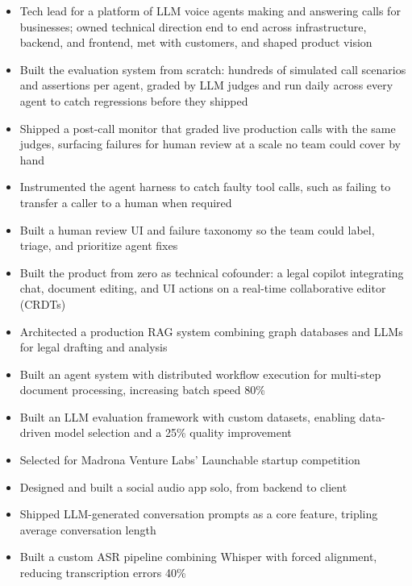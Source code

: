 \documentclass{my_cv}
\begin{document}
\begin{itemize}
\item Tech lead for a platform of LLM voice agents making and answering calls for businesses; owned technical direction end to end across infrastructure, backend, and frontend, met with customers, and shaped product vision
\item Built the evaluation system from scratch: hundreds of simulated call scenarios and assertions per agent, graded by LLM judges and run daily across every agent to catch regressions before they shipped
\item Shipped a post-call monitor that graded live production calls with the same judges, surfacing failures for human review at a scale no team could cover by hand
\item Instrumented the agent harness to catch faulty tool calls, such as failing to transfer a caller to a human when required
\item Built a human review UI and failure taxonomy so the team could label, triage, and prioritize agent fixes
\end{itemize}


\begin{itemize}
\item Built the product from zero as technical cofounder: a legal copilot integrating chat, document editing, and UI actions on a real-time collaborative editor (CRDTs)
\item Architected a production RAG system combining graph databases and LLMs for legal drafting and analysis
\item Built an agent system with distributed workflow execution for multi-step document processing, increasing batch speed 80\%
\item Built an LLM evaluation framework with custom datasets, enabling data-driven model selection and a 25\% quality improvement
\item Selected for Madrona Venture Labs' Launchable startup competition
\end{itemize}


\begin{itemize}
\item Designed and built a social audio app solo, from backend to client
\item Shipped LLM-generated conversation prompts as a core feature, tripling average conversation length
\item Built a custom ASR pipeline combining Whisper with forced alignment, reducing transcription errors 40\%
\end{itemize}
\end{document}
